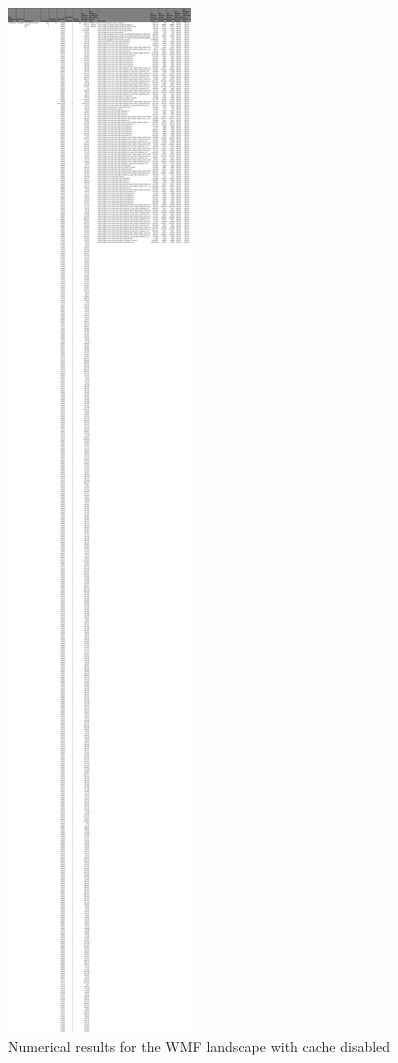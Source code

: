 \begin{figure}[!h]
	\centering
	\begin{adjustbox}{width=\textwidth,totalheight=0.8\textheight}
		\includegraphics[angle=90]{Figures/wmf_allhar.pdf}
	\end{adjustbox}
	\caption{Numerical results for the WMF landscape with cache disabled}
	\label{fig:appendix_1_26}
\end{figure}
